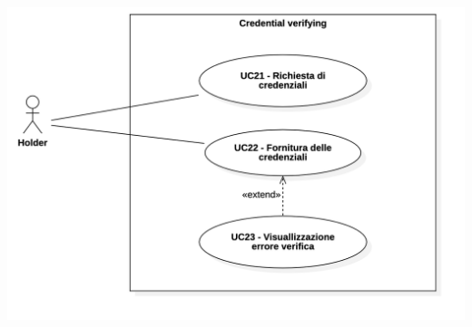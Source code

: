 \begin{center}
    \includegraphics[scale = 0.32]{./res/img/4Credential_verifying.png}
  \end{center}